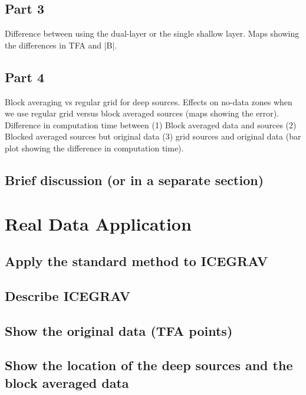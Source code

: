 \subsection{Part 3}
Difference between using the dual-layer or the single shallow layer. Maps showing the differences in TFA and |B|.

\subsection{Part 4}
Block averaging vs regular grid for deep sources. Effects on no-data zones when we use regular grid versus block averaged sources (maps showing the error). Difference in computation time between (1) Block averaged data and sources (2) Blocked averaged sources but original data (3) grid sources and original data (bar plot showing the difference in computation time).

\subsection{Brief discussion (or in a separate section)}



\section{Real Data Application}

\subsection{Apply the standard method to ICEGRAV}

\subsection{Describe ICEGRAV}

\subsection{Show the original data (TFA points)}

\subsection{Show the location of the deep sources and the block averaged data}

